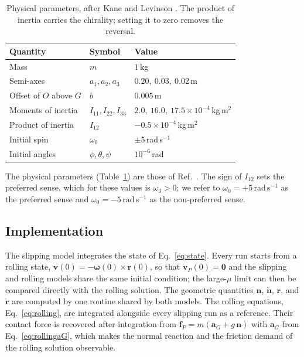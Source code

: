 \documentclass[aps,pre,twocolumn,superscriptaddress,amsmath,amssymb,floatfix,nofootinbib]{revtex4-2}
\newcommand{\rpg}{\bm{r}}
\newcommand{\ve}[1]{\bm{#1}}
\newcommand{\rdot}{\mathring{\bm r}}
\begin{document}
\begin{table}[!tbp]
\caption{Physical parameters, after Kane and Levinson \cite{Kane1982}. The product of
inertia carries the chirality; setting it to zero removes the reversal.}
\label{tab:params}
\begin{ruledtabular}
\begin{tabular}{lll}
Quantity & Symbol & Value \\
\hline
Mass & $m$ & $1$\,kg \\
Semi-axes & $a_1,a_2,a_3$ & $0.20,\ 0.03,\ 0.02$\,m \\
Offset of $O$ above $G$ & $b$ & $0.005$\,m \\
Moments of inertia & $I_{11},I_{22},I_{33}$ & $2.0,\ 16.0,\ 17.5\times10^{-4}$\,kg\,m$^2$ \\
Product of inertia & $I_{12}$ & $-0.5\times10^{-4}$\,kg\,m$^2$ \\
Initial spin & $\omega_0$ & $\pm5$\,rad\,s$^{-1}$ \\
Initial angles & $\phi,\theta,\psi$ & $10^{-6}$\,rad \\
\end{tabular}
\end{ruledtabular}
\end{table}

The physical parameters (Table~\ref{tab:params}) are those of Ref.~\cite{Kane1982}. The
sign of $I_{12}$ sets the preferred sense, which for these values is $\omega_3>0$; we
refer to $\omega_0=+5$\,rad\,s$^{-1}$ as the preferred sense and
$\omega_0=-5$\,rad\,s$^{-1}$ as the non-preferred sense.

\subsection{Implementation}

The slipping model integrates the state of Eq.~\eqref{eq:state}. Every run starts from
a rolling state, $\ve v(0)=-\bm\omega(0)\times\rpg(0)$, so that $\ve v_P(0)=\ve 0$ and the
slipping and rolling models share the same initial condition; the large-$\mu$ limit can
then be compared directly with the rolling solution. The geometric quantities $\ve n$,
$\dot{\ve n}$, $\rpg$, and $\rdot$ are computed by one routine shared by both models.
The rolling equations, Eq.~\eqref{eq:rolling}, are integrated alongside every slipping
run as a reference. Their contact force is recovered after integration from
$\ve f_P=m(\ve a_G+g\,\ve n)$ with $\ve a_G$ from Eq.~\eqref{eq:rollingaG}, which makes the
normal reaction and the friction demand of the rolling solution observable.
\end{document}
